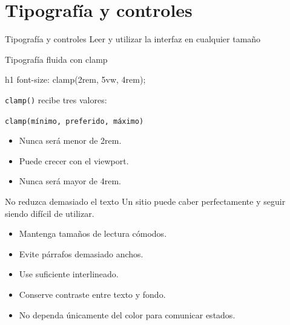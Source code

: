 \documentclass[aspectratio=169,11pt]{beamer}
\begin{document}
    \section{Tipografía y controles}

    \SectionSlide
    {Tipografía y controles}
    {Leer y utilizar la interfaz en cualquier tamaño}

    \begin{frame}[fragile]{Tipografía fluida con clamp}
        \begin{csscodedark}
            h1 {
                font-size: clamp(2rem, 5vw, 4rem);
            }
        \end{csscodedark}

        \texttt{clamp()} recibe tres valores:

        \begin{center}
            \texttt{clamp(mínimo, preferido, máximo)}
        \end{center}

        \begin{itemize}
            \item Nunca será menor de 2rem.
            \item Puede crecer con el viewport.
            \item Nunca será mayor de 4rem.
        \end{itemize}
    \end{frame}

    \begin{frame}{No reduzca demasiado el texto}
        Un sitio puede caber perfectamente y seguir siendo difícil de utilizar.

        \begin{itemize}
            \item Mantenga tamaños de lectura cómodos.
            \item Evite párrafos demasiado anchos.
            \item Use suficiente interlineado.
            \item Conserve contraste entre texto y fondo.
            \item No dependa únicamente del color para comunicar estados.
        \end{itemize}

    \end{frame}
\end{document}
